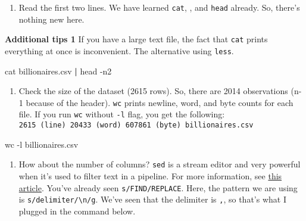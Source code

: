 \documentclass[
]{book}
\newenvironment{Shaded}{\begin{snugshade}}{\end{snugshade}}
\newcommand{\AttributeTok}[1]{\textcolor[rgb]{0.77,0.63,0.00}{#1}}
\newcommand{\FunctionTok}[1]{\textcolor[rgb]{0.00,0.00,0.00}{#1}}
\newcommand{\KeywordTok}[1]{\textcolor[rgb]{0.13,0.29,0.53}{\textbf{#1}}}
\newcommand{\NormalTok}[1]{#1}
\providecommand{\tightlist}{%
  \setlength{\itemsep}{0pt}\setlength{\parskip}{0pt}}
\begin{document}
\begin{enumerate}
\def\labelenumi{\arabic{enumi}.}
\setcounter{enumi}{1}
\tightlist
\item
  Read the first two lines. We have learned \texttt{cat}, \texttt{\textbar{}}, and \texttt{head} already. So, there's nothing new here.
\end{enumerate}

\textbf{Additional tips 1}
If you have a large text file, the fact that \texttt{cat} prints everything at once is inconvenient. The alternative using \texttt{less}.

\begin{Shaded}
\begin{Highlighting}[]
\FunctionTok{cat}\NormalTok{ billionaires.csv }\KeywordTok{|} \FunctionTok{head} \AttributeTok{{-}n2}
\end{Highlighting}
\end{Shaded}

\begin{enumerate}
\def\labelenumi{\arabic{enumi}.}
\setcounter{enumi}{2}
\tightlist
\item
  Check the size of the dataset (2615 rows). So, there are 2014 observations (n-1 because of the header). \texttt{wc} prints newline, word, and byte counts for each file. If you run \texttt{wc} without \texttt{-l} flag, you get the following: \texttt{2615\ (line)\ 20433\ (word)\ 607861\ (byte)\ billionaires.csv}
\end{enumerate}

\begin{Shaded}
\begin{Highlighting}[]
\FunctionTok{wc} \AttributeTok{{-}l}\NormalTok{ billionaires.csv}
\end{Highlighting}
\end{Shaded}

\begin{enumerate}
\def\labelenumi{\arabic{enumi}.}
\setcounter{enumi}{3}
\tightlist
\item
  How about the number of columns? \texttt{sed} is a stream editor and very powerful when it's used to filter text in a pipeline. For more information, see \href{https://www.gnu.org/software/sed/manual/sed.html}{this article}. You've already seen \texttt{s/FIND/REPLACE}. Here, the pattern we are using is \texttt{s/delimiter/\textbackslash{}n/g}. We've seen that the delimiter is \texttt{,}, so that's what I plugged in the command below.
\end{enumerate}
\end{document}
